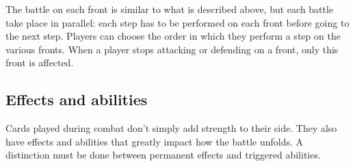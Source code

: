 \documentclass[a4paper]{article}
\begin{document}
    The battle on each front is similar to what is described above,
    but each battle take place in parallel:
    each step has to be performed on each front before going to the next step.
    Players can choose the order in which they perform a step on the various fronts.
    When a player stops attacking or defending on a front, only this front is affected.


\newpage
\subsection{Effects and abilities}

    Cards played during combat don't simply add strength to their side.
    They also have effects and abilities that greatly impact how the battle unfolds.
    A distinction must be done between permanent effects and triggered abilities.
\end{document}
